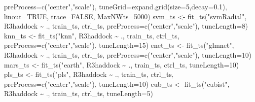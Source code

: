\documentclass[
  letterpaper,
  DIV=11,
  numbers=noendperiod]{scrreprt}
\newenvironment{Shaded}{\begin{snugshade}}{\end{snugshade}}
\newcommand{\AttributeTok}[1]{\textcolor[rgb]{0.40,0.45,0.13}{#1}}
\newcommand{\ConstantTok}[1]{\textcolor[rgb]{0.56,0.35,0.01}{#1}}
\newcommand{\DecValTok}[1]{\textcolor[rgb]{0.68,0.00,0.00}{#1}}
\newcommand{\FloatTok}[1]{\textcolor[rgb]{0.68,0.00,0.00}{#1}}
\newcommand{\FunctionTok}[1]{\textcolor[rgb]{0.28,0.35,0.67}{#1}}
\newcommand{\NormalTok}[1]{\textcolor[rgb]{0.00,0.23,0.31}{#1}}
\newcommand{\OtherTok}[1]{\textcolor[rgb]{0.00,0.23,0.31}{#1}}
\newcommand{\SpecialCharTok}[1]{\textcolor[rgb]{0.37,0.37,0.37}{#1}}
\newcommand{\StringTok}[1]{\textcolor[rgb]{0.13,0.47,0.30}{#1}}
\begin{document}
\begin{Shaded}
\begin{Highlighting}[]
                  \AttributeTok{preProcess=}\FunctionTok{c}\NormalTok{(}\StringTok{"center"}\NormalTok{,}\StringTok{"scale"}\NormalTok{),}
                  \AttributeTok{tuneGrid=}\FunctionTok{expand.grid}\NormalTok{(}\AttributeTok{size=}\DecValTok{5}\NormalTok{,}\AttributeTok{decay=}\FloatTok{0.1}\NormalTok{), }\AttributeTok{linout=}\ConstantTok{TRUE}\NormalTok{, }\AttributeTok{trace=}\ConstantTok{FALSE}\NormalTok{, }\AttributeTok{MaxNWts=}\DecValTok{5000}\NormalTok{)}
\NormalTok{svm\_ts  }\OtherTok{\textless{}{-}} \FunctionTok{fit\_ts}\NormalTok{(}\StringTok{"svmRadial"}\NormalTok{, R3haddock }\SpecialCharTok{\textasciitilde{}}\NormalTok{ ., train\_ts, ctrl\_ts, }\AttributeTok{preProcess=}\FunctionTok{c}\NormalTok{(}\StringTok{"center"}\NormalTok{,}\StringTok{"scale"}\NormalTok{), }\AttributeTok{tuneLength=}\DecValTok{8}\NormalTok{)}
\NormalTok{knn\_ts  }\OtherTok{\textless{}{-}} \FunctionTok{fit\_ts}\NormalTok{(}\StringTok{"knn"}\NormalTok{,       R3haddock }\SpecialCharTok{\textasciitilde{}}\NormalTok{ ., train\_ts, ctrl\_ts, }\AttributeTok{preProcess=}\FunctionTok{c}\NormalTok{(}\StringTok{"center"}\NormalTok{,}\StringTok{"scale"}\NormalTok{), }\AttributeTok{tuneLength=}\DecValTok{15}\NormalTok{)}
\NormalTok{enet\_ts }\OtherTok{\textless{}{-}} \FunctionTok{fit\_ts}\NormalTok{(}\StringTok{"glmnet"}\NormalTok{,    R3haddock }\SpecialCharTok{\textasciitilde{}}\NormalTok{ ., train\_ts, ctrl\_ts, }\AttributeTok{preProcess=}\FunctionTok{c}\NormalTok{(}\StringTok{"center"}\NormalTok{,}\StringTok{"scale"}\NormalTok{), }\AttributeTok{tuneLength=}\DecValTok{10}\NormalTok{)}
\NormalTok{mars\_ts }\OtherTok{\textless{}{-}} \FunctionTok{fit\_ts}\NormalTok{(}\StringTok{"earth"}\NormalTok{,     R3haddock }\SpecialCharTok{\textasciitilde{}}\NormalTok{ ., train\_ts, ctrl\_ts, }\AttributeTok{tuneLength=}\DecValTok{10}\NormalTok{)}
\NormalTok{pls\_ts  }\OtherTok{\textless{}{-}} \FunctionTok{fit\_ts}\NormalTok{(}\StringTok{"pls"}\NormalTok{,       R3haddock }\SpecialCharTok{\textasciitilde{}}\NormalTok{ ., train\_ts, ctrl\_ts, }\AttributeTok{preProcess=}\FunctionTok{c}\NormalTok{(}\StringTok{"center"}\NormalTok{,}\StringTok{"scale"}\NormalTok{), }\AttributeTok{tuneLength=}\DecValTok{10}\NormalTok{)}
\NormalTok{cub\_ts  }\OtherTok{\textless{}{-}} \FunctionTok{fit\_ts}\NormalTok{(}\StringTok{"cubist"}\NormalTok{,    R3haddock }\SpecialCharTok{\textasciitilde{}}\NormalTok{ ., train\_ts, ctrl\_ts, }\AttributeTok{tuneLength=}\DecValTok{5}\NormalTok{)}


\end{Highlighting}
\end{Shaded}
\end{document}
